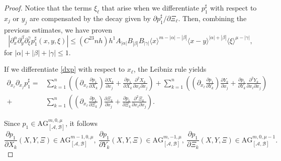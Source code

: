 \documentclass[11pt,reqno]{amsart}
\numberwithin{equation}{section}
\newcommand{\AG}{{\mathrm{AG}}}
\newcommand{\A}{{\mathcal{A}}} %
\newcommand{\B}{{\mathcal{B}}} %
\begin{document}
\begin{proof}
	Notice that the terms $\xi_\ell$ that arise when we differentiate $p_1^\sharp$ with respect to $x_j$ or $y_j$ are compensated by the decay given by 
	$\partial p_1^\sharp/\partial\Xi_\ell$. Then, combining the previous estimates, we have proven
	\begin{equation}\label{est_1st}
		\left| \partial^\alpha_x\partial^\beta_y\partial^\gamma_\xi p_1^\sharp(x,y,\xi) \right|\leq (C^23nh)h^1 A_{|\alpha|}B_{|\beta|}B_{|\gamma|} 
		 \langle x\rangle^{m-|\alpha|-|\beta|}\langle x-y\rangle^{|\alpha|+|\beta|} \langle\xi\rangle^{\mu-|\gamma|},
	\end{equation}
	for $|\alpha|+|\beta|+|\gamma|\leq 1$.
	
	If we differentiate \eqref{dxp} with respect to $x_\ell$, the Leibniz rule yields
	\begin{align*}\label{dxxp}
		\partial_{x_\ell}\partial_{x_j}p_1^\sharp = & \sum_{k=1}^n \left( \left(\partial_{x_\ell}\frac{\partial p_1}{\partial X_k}\right)\frac{\partial X_k}{\partial x_j}+\frac{\partial p_1}{\partial X_k}\frac{\partial^2 X_k}{\partial x_\ell\partial x_j}\right) + \sum_{k=1}^{n}\left( \left(\partial_{x_\ell}\frac{\partial p_1}{\partial Y_k}\right)\frac{\partial Y_k}{\partial x_j}+\frac{\partial p_1}{\partial Y_k}\frac{\partial^2 Y_k}{\partial x_\ell\partial x_j}\right)\\
		 + &\sum_{k=1}^{n}\left( \left(\partial_{x_\ell}\frac{\partial p_1}{\partial \Xi_k}\right)\frac{\partial \Xi_k}{\partial x_j}+\frac{\partial p_1}{\partial \Xi_k}\frac{\partial^2 \Xi_k}{\partial x_\ell\partial x_j}\right). 
	\end{align*}
	
	Since $p_1\in \AG_{[\A,\B]}^{m,0,\mu}$, it follows
	\[
	\frac{\partial p_1}{\partial X_k}(X,Y,\Xi)\in \AG_{[\A,\B]}^{m-1,0,\mu},\ 
	\frac{\partial p_1}{\partial Y_k}(X,Y,\Xi)\in \AG_{[\A,\B]}^{m,-1,\mu},\ 
	\frac{\partial p_1}{\partial \Xi_k}(X,Y,\Xi)\in \AG_{[\A,\B]}^{m,0,\mu-1}.
	\]
	

\end{proof}
\end{document}
